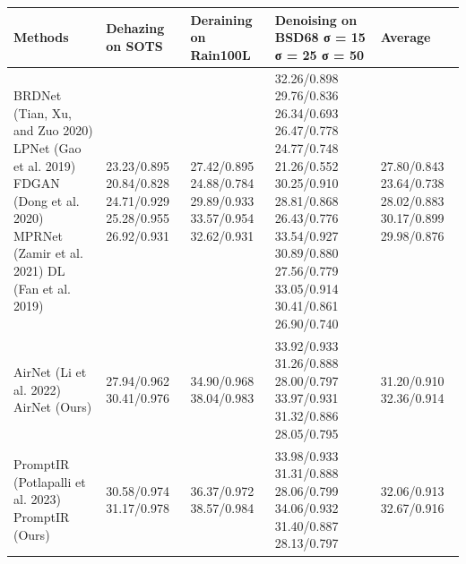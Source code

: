 \begin{tabular}{lllll}
\toprule
Methods & Dehazing on SOTS & Deraining on Rain100L & Denoising on BSD68 σ = 15 σ = 25 σ = 50 & Average \\
\midrule
BRDNet (Tian, Xu, and Zuo 2020) LPNet (Gao et al. 2019) FDGAN (Dong et al. 2020) MPRNet (Zamir et al. 2021) DL (Fan et al. 2019) & 23.23/0.895 20.84/0.828 24.71/0.929 25.28/0.955 26.92/0.931 & 27.42/0.895 24.88/0.784 29.89/0.933 33.57/0.954 32.62/0.931 & 32.26/0.898 29.76/0.836 26.34/0.693 26.47/0.778 24.77/0.748 21.26/0.552 30.25/0.910 28.81/0.868 26.43/0.776 33.54/0.927 30.89/0.880 27.56/0.779 33.05/0.914 30.41/0.861 26.90/0.740 & 27.80/0.843 23.64/0.738 28.02/0.883 30.17/0.899 29.98/0.876 \\
AirNet (Li et al. 2022) AirNet (Ours) & 27.94/0.962 30.41/0.976 & 34.90/0.968 38.04/0.983 & 33.92/0.933 31.26/0.888 28.00/0.797 33.97/0.931 31.32/0.886 28.05/0.795 & 31.20/0.910 32.36/0.914 \\
PromptIR (Potlapalli et al. 2023) PromptIR (Ours) & 30.58/0.974 31.17/0.978 & 36.37/0.972 38.57/0.984 & 33.98/0.933 31.31/0.888 28.06/0.799 34.06/0.932 31.40/0.887 28.13/0.797 & 32.06/0.913 32.67/0.916 \\
\bottomrule
\end{tabular}
